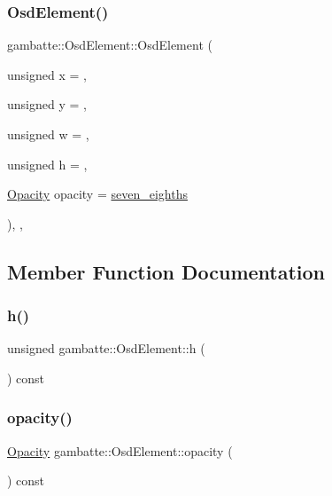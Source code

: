 \subsubsection{\texorpdfstring{Osd\+Element()}{OsdElement()}}
{\footnotesize\ttfamily gambatte\+::\+Osd\+Element\+::\+Osd\+Element (\begin{DoxyParamCaption}\item[{unsigned}]{x = {},  }\item[{unsigned}]{y = {},  }\item[{unsigned}]{w = {},  }\item[{unsigned}]{h = {},  }\item[{\hyperlink{classgambatte_1_1OsdElement_a1e52ecfbc0d4337e1f2b38d6c4a97636}{Opacity}}]{opacity = {\ttfamily \hyperlink{classgambatte_1_1OsdElement_a1e52ecfbc0d4337e1f2b38d6c4a97636a1f8c4eebdca1a18dff836db5d55de550}{seven\+\_\+eighths}} }\end{DoxyParamCaption})\hspace{0.3cm}{\ttfamily [inline]}, {\ttfamily [explicit]}, {\ttfamily [protected]}}



\subsection{Member Function Documentation}
\mbox{\label{classgambatte_1_1OsdElement_a06b0891145ca9aac2d10cf9646681ce3}} 
\subsubsection{\texorpdfstring{h()}{h()}}
{\footnotesize\ttfamily unsigned gambatte\+::\+Osd\+Element\+::h (\begin{DoxyParamCaption}{ }\end{DoxyParamCaption}) const\hspace{0.3cm}{\ttfamily [inline]}}

\mbox{\label{classgambatte_1_1OsdElement_a17774fcbd38501a675f3dfb616be23ad}} 
\subsubsection{\texorpdfstring{opacity()}{opacity()}}
{\footnotesize\ttfamily \hyperlink{classgambatte_1_1OsdElement_a1e52ecfbc0d4337e1f2b38d6c4a97636}{Opacity} gambatte\+::\+Osd\+Element\+::opacity (\begin{DoxyParamCaption}{ }\end{DoxyParamCaption}) const\hspace{0.3cm}{\ttfamily [inline]}}

